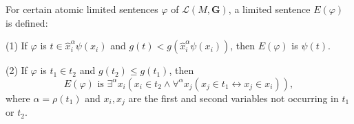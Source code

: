 For certain atomic limited sentences $\varphi$ of $\mathcal{L}(M, \mathbf{G})$, a limited sentence $E(\varphi)$ is defined:

(1) If $\varphi$ is $t \in \hat{x}_i^\alpha \psi(x_i)$ and $g(t) < g(\hat{x}_i^\alpha \psi(x_i))$, then $E(\varphi)$ is $\psi(t)$.

(2) If $\varphi$ is $t_1 \in t_2$ and $g(t_2) \leq g(t_1)$, then
$$E(\varphi) \text{ is } \exists^\alpha x_i(x_i \in t_2 \land \forall^\alpha x_j(x_j \in t_1 \leftrightarrow x_j \in x_i)),$$
where $\alpha = \rho(t_1)$ and $x_i, x_j$ are the first and second variables not occurring in $t_1$ or $t_2$.
